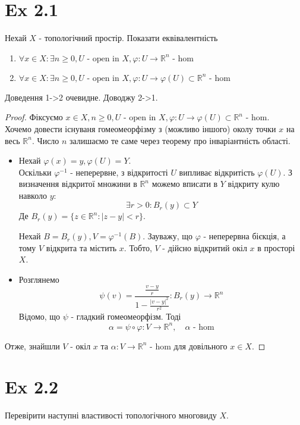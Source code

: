 \documentclass[11pt, a4paper]{article} %
\newcommand{\R}{\mathbb{R}}
\begin{document}
\section*{Ex 2.1}
\begin{mdframed}
Нехай $X$ - топологічний простір. Показати еквівалентність
\begin{enumerate}
    \item $\forall x \in X: \exists n\ge 0, U \text{ - open in } X, \varphi:U \to \R^n \text{ - hom}$
    \item $\forall x \in X: \exists n\ge 0, U \text{ - open in } X, \varphi:U \to \varphi(U) \subset \R^n \text{ - hom}$
\end{enumerate}
\end{mdframed}
Доведення 1->2 очевидне. Доводжу 2->1.
\begin{proof}
    Фіксуємо 
    $x\in X, n\ge0, U \text{ - open in } X, \varphi:U \to \varphi(U) \subset \R^n \text{ - hom}$.\\
    Хочемо довести існуваня гомеомеорфізму з (можливо іншого) околу точки $x$ на весь $\R^n$. 
    Число $n$ залишаємо те саме через теорему про інваріантність області.
\begin{itemize}
    \item 
    Нехай $\varphi(x) = y, \varphi(U) = Y$.\\
    Оскільки $\varphi^{-1}$ - неперервне, з відкритості $U$ випливає відкритість $\varphi(U)$.
    З визначення відкритої множини в $\R^n$ можемо вписати в $Y$ відкриту кулю навколо $y$:
    \[\exists r>0: B_r(y) \subset Y\]
    Де $B_r(y) = \{z\in \R^n : |z-y| < r\}$.
    
    Нехай $B = B_r(y), V = \varphi^{-1}(B)$. Зауважу, що $\varphi$ - неперервна бієкція, а тому $V$ відкрита та містить $x$.
    Тобто, $V$ - дійсно відкритий окіл $x$ в просторі $X$.

    \item
    Розглянемо 
    \[\psi(v) = \frac{\frac{v-y}{r}}{1 - \frac{|v-y|^2}{r^2}} : B_r(y) \to \R^n\]
    Відомо, що $\psi$ - гладкий гомеомеорфізм.
    Тоді 
    \[\alpha = \psi\circ\varphi : V \to \R^n, \quad \alpha \text{ - hom}\] 
\end{itemize}
Отже, знайшли $V$ - окіл $x$ та $\alpha : V \to \R^n$ - hom для довільного $x \in X$.
\end{proof}

\section*{Ex 2.2}
\begin{mdframed}
    Перевірити наступні властивості топологічного многовиду $X$.
\end{mdframed}
\end{document}
